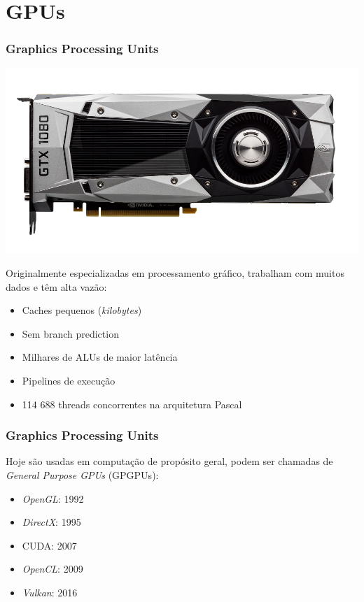 \documentclass[10pt, compress]{beamer}
\begin{document}
\section{GPUs}

\begin{frame}
    \frametitle{Graphics Processing Units}
    \begin{center}
        \includegraphics[width=.6\textwidth]{gtx1080}
    \end{center}
    \pause

    Originalmente especializadas em \alert{processamento gráfico},
    trabalham com muitos dados e têm \alert{alta vazão}:
    \pause

    \begin{itemize}
        \item Caches pequenos (\textit{kilobytes})
            \pause
        \item Sem \alert{branch prediction}
            \pause
        \item \alert{Milhares} de ALUs de \alert{maior latência}
            \pause
        \item \alert{Pipelines} de execução
            \pause
        \item 114 688 \alert{threads} concorrentes na arquitetura Pascal
    \end{itemize}
\end{frame}

\begin{frame}
    \frametitle{Graphics Processing Units}
    Hoje são usadas em computação de propósito geral, podem ser chamadas de
    \textit{General Purpose GPUs} (GPGPUs):
    \pause
    \begin{itemize}
        \item \textit{OpenGL}: 1992
        \item \textit{DirectX}: 1995
        \item \alert{CUDA}: 2007
        \item \textit{OpenCL}: 2009
        \item \textit{Vulkan}: 2016
    \end{itemize}
\end{frame}
\end{document}
